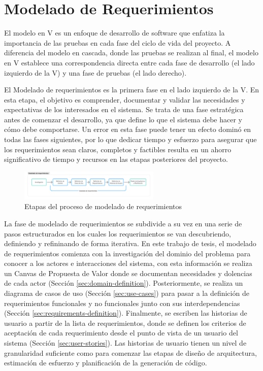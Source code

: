 \chapter[Modelado de Requerimientos]{Modelado de Requerimientos}
\label{cp:modelling}

\parindent0pt

El modelo en V es un enfoque de desarrollo de software que enfatiza la importancia de las pruebas en cada fase del ciclo de vida del proyecto. A diferencia del modelo en cascada, donde las pruebas se realizan al final, el modelo en V establece una correspondencia directa entre cada fase de desarrollo (el lado izquierdo de la V) y una fase de pruebas (el lado derecho).

El Modelado de requerimientos es la primera fase en el lado izquierdo de la V. En esta etapa, el objetivo es comprender, documentar y validar las necesidades y expectativas de los interesados en el sistema. Se trata de una fase estratégica antes de comenzar el desarrollo, ya que define lo que el sistema debe hacer y cómo debe comportarse. Un error en esta fase puede tener un efecto dominó en todas las fases siguientes, por lo que dedicar tiempo y esfuerzo para asegurar que los requerimientos sean claros, completos y factibles resulta en un ahorro significativo de tiempo y recursos en las etapas posteriores del proyecto.

\begin{figure}[!htpb]
    \centering
    \includegraphics[width=0.6\textwidth]{Figures/requirements-modelling.png}
    \caption{Etapas del proceso de modelado de requerimientos}
    \label{fig:requirements-modelling-process}
\end{figure}

La fase de modelado de requerimientos se subdivide a su vez en una serie de pasos estructurados en los cuales los requerimientos se van descubriendo, definiendo y refininando de forma iterativa. En este trabajo de tesis, el modelado de requerimientos comienza con la investigación del dominio del problema para conocer a los actores e interacciones del sistema, con esta información se realiza un Canvas de Propuesta de Valor donde se documentan necesidades y dolencias de cada actor (Sección \ref{sec:domain-definition}). Posteriormente, se realiza un diagrama de casos de uso (Sección \ref{sec:use-cases}) para pasar a la definición de requerimientos funcionales y no funcionales junto con sus interdependencias (Sección \ref{sec:requirements-definition}). Finalmente, se escriben las historias de usuario a partir de la lista de requerimientos, donde se definen los criterios de aceptación de cada requerimiento desde el punto de vista de un usuario del sistema (Sección \ref{sec:user-stories}). Las historias de usuario tienen un nivel de granularidad suficiente como para comenzar las etapas de diseño de arquitectura, estimación de esfuerzo y planificación de la generación de código.

